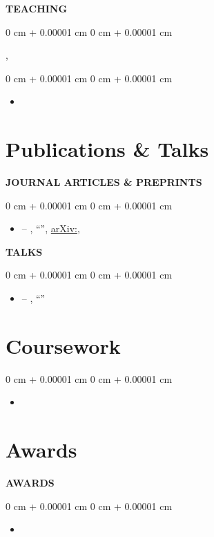\documentclass[10pt, letterpaper]{article}
\newenvironment{highlights}{
    \begin{itemize}[
        topsep=0.10 cm,
        parsep=0.10 cm,
        partopsep=0pt,
        itemsep=0pt,
        leftmargin=0 cm + 10pt
    ]
}{
    \end{itemize}
} %
\newenvironment{onecolentry}{
    \begin{adjustwidth}{
        0 cm + 0.00001 cm
    }{
        0 cm + 0.00001 cm
    }
}{
    \end{adjustwidth}
} %
\newenvironment{twocolentry}[2][]{
    \onecolentry
    \def\secondColumn{#2}
    \setcolumnwidth{\fill, 4.5 cm}
    \begin{paracol}{2}
}{
    \switchcolumn \raggedleft \secondColumn
    \end{paracol}
    \endonecolentry
} %
\begin{document}
\vspace{0.2cm}
\textbf{TEACHING}
\begin{twocolentry}{}
    \textbf{}, 
\end{twocolentry}
\begin{onecolentry}
\begin{highlights}
\item {}
\end{highlights}
\end{onecolentry}

\section{Publications \& Talks}
\textbf{\MakeUppercase{Journal Articles \& Preprints}}
\begin{onecolentry}
\begin{highlights}
 \item {} -- , ``'', \href{https://arxiv.org/abs/\VAR{pub.arxiv}}{arXiv:}, 
\end{highlights}
\end{onecolentry}

\vspace{0.2cm}
\textbf{\MakeUppercase{Talks}}
\begin{onecolentry}
\begin{highlights}
\item {} -- , ``''
\end{highlights}
\end{onecolentry}

\section{Coursework}
\begin{onecolentry}
\begin{highlights}
    \item {}
\end{highlights}
\end{onecolentry}

\section{Awards}
\textbf{AWARDS}
\begin{onecolentry}
\begin{highlights}
\item {}
\end{highlights}
\end{onecolentry}
\end{document}
